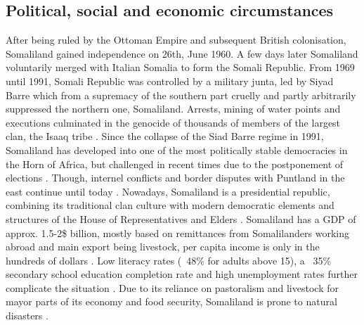 



\subsection{Political, social and economic circumstances} %

After being ruled by the Ottoman Empire and subsequent British colonisation, Somaliland gained independence on 26th, June 1960. A few days later Somaliland voluntarily merged with Italian Somalia to form the Somali Republic. From 1969 until 1991, Somali Republic was controlled by a military junta, led by Siyad Barre which from a supremacy of the southern part cruelly and partly arbitrarily suppressed the northern one, Somaliland. Arrests, mining of water points and executions culminated in the genocide of thousands of members of the largest clan, the Isaaq tribe \autocite{peiferStoppingMassKillings2009,republicofsomaliaCountryProfile20212021}. Since the collapse of the Siad Barre regime in 1991, Somaliland has developed into one of the most politically stable democracies in the Horn of Africa, but challenged in recent times due to the postponement of elections \autocite{bbcSomalilandProfile2022, fortiPocketStabilityUnderstanding2011}. Though, internel conflicts and border disputes with Puntland in the east continue until today \autocite{filhoDEMOCRACYAFRICAOUTSTANDING2021}. Nowadays, Somaliland is a presidential republic, combining its traditional clan culture with modern democratic elements and structures of the House of Representatives and Elders \autocite{salemTerritorialDiagnosticReport2016}.
Somaliland has a GDP of approx. 1.5-2\$ billion, mostly based on remittances from Somalilanders working abroad and main export being livestock, per capita income is only in the hundreds of dollars \autocite{klobucistaSomalilandHornAfrica2018, republicofsomaliaCountryProfile20212021, worldbankNewWorldBank2014}. Low literacy rates (~48\% for adults above 15), a ~35\% secondary school education completion rate and high unemployment rates further complicate the situation \autocite{republicofsomaliaCountryProfile20212021,worldbankNewWorldBank2014}. Due to its reliance on pastoralism and livestock for mayor parts of its economy and food security, Somaliland is prone to natural disasters \autocite{usaidcenterforresilienceEconomicsResilienceDrought2018}.


